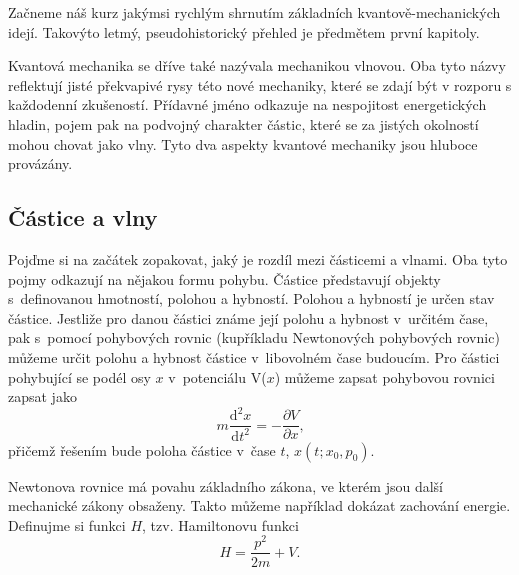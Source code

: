 \newcommand{\dd}{\mathrm{d}}

Začneme náš kurz jakýmsi rychlým shrnutím základních kvantově-mechanických idejí. Takovýto letmý, pseudohistorický přehled je předmětem první kapitoly.

Kvantová mechanika se dříve také nazývala mechanikou vlnovou. Oba tyto názvy reflektují jisté překvapivé rysy této nové mechaniky, které se zdají být v rozporu s každodenní zkušeností. Přídavné jméno  odkazuje na nespojitost energetických hladin, pojem  pak na podvojný charakter částic, které se za jistých okolností mohou chovat jako vlny. Tyto dva aspekty kvantové mechaniky jsou hluboce provázány.

\subsection{Částice a vlny}	
Pojďme si na začátek zopakovat, jaký je rozdíl mezi částicemi a vlnami. Oba tyto pojmy odkazují na nějakou formu pohybu. Částice představují objekty s~definovanou hmotností, polohou a hybností. Polohou a hybností je určen stav částice. Jestliže pro danou částici známe její polohu a hybnost v~určitém čase, pak s~pomocí pohybových rovnic (kupříkladu Newtonových pohybových rovnic) můžeme určit polohu a hybnost částice v~libovolném čase budoucím. Pro částici pohybující se podél osy $x$ v~potenciálu V($x$) můžeme zapsat pohybovou rovnici zapsat jako
\begin{equation}
m \frac{\mathrm{d}^2 x}{\mathrm{d}t^2} = -\frac{\partial{V}}{\partial{x}}  \mbox{,}
\label{rov:Castice}
\end{equation}
přičemž řešením bude poloha částice v~čase $t$, $x(t; x_0,p_0)$.

Newtonova rovnice má povahu základního zákona, ve kterém jsou další mechanické zákony obsaženy. Takto můžeme například dokázat zachování energie. Definujme si funkci $H$, tzv. Hamiltonovu funkci
\begin{equation}
H = \frac{p^2}{2m}+V\mbox{.}
\label{rov:hamiltonfce}
\end{equation}

